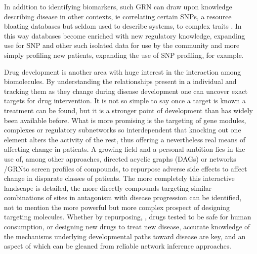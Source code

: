 In addition to identifying biomarkers, such GRN can draw upon knowledge describing disease in other contexts, ie correlating certain SNPs, a resource bloating databases but seldom used to describe systems, to complex traits \cite{platig2016bipartite}. In this way databases become enriched with new regulatory knowledge, expanding use for SNP and other such isolated data for use by the community and more simply profiling new patients, expanding the use of SNP profiling, for example.

Drug development is another area with huge interest in the interaction among biomolecules. By understanding the relationships present in a individual and tracking them as they change during disease development one can uncover exact targets for drug intervention. It is not so simple to say once a target is known a treatment can be found, but it is a stronger point of development than has widely been available before. What is more promising is the targeting of gene modules, complexes or regulatory subnetworks so interdependent that knocking out one element alters the activity of the rest, thus offering a nevertheless real means of affecting change in patients. A growing field and a personal ambition lies in the use of, among other approaches, directed acyclic graphs (DAGs) or networks /GRNto screen profiles of compounds, to repurpose adverse side effects to affect change in disparate classes of patients. The more completely this interactive landscape is detailed, the more directly compounds targeting similar combinations of sites in antagonism with disease progression can be identified, not to mention the more powerful but more complex prospect of designing targeting molecules. Whether by repurposing, , drugs tested to be safe for human consumption, or designing new drugs to treat new disease, accurate knowledge of the mechanisms underlying developmental paths toward disease are key, and an aspect of which can be gleaned from reliable network inference approaches.
